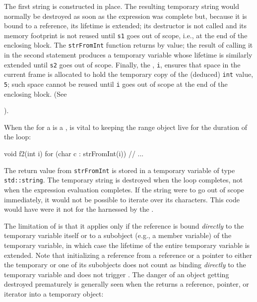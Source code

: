 {{\noindent The first string is constructed in place. The resulting temporary string
would normally be destroyed as soon as the expression was complete but,
because it is bound to a reference, its lifetime is extended; its
destructor is not called and its memory footprint is not reused until
\lstinline!s1! goes out of scope, i.e., at the end of the enclosing block.
The \lstinline!strFromInt! function returns by value; the result of calling
it in the second statement produces a temporary variable whose lifetime
is similarly extended until \lstinline!s2! goes out of scope. Finally, the
, \lstinline!i!, ensures that space in the
current frame is allocated to hold the temporary copy of the (deduced)
\lstinline!int! value, \lstinline!5!; such space cannot be reused until
\lstinline!i! goes out of scope at the end of the enclosing block. (See
{).

When the  for a  is a ,  is
vital to keeping the range object live for the duration of the loop:

\begin{emcppslisting}[emcppsbatch=e3]
void f2(int i)
{
    for (char c : strFromInt(i))
    {
        // ...
    }
}
\end{emcppslisting}
    

\noindent The return value from \lstinline!strFromInt! is stored in a temporary
variable of type \lstinline!std::string!. The temporary string is destroyed
when the loop completes, not when the expression evaluation completes.
If the string were to go out of scope immediately, it would not be
possible to iterate over its characters. This code would have
 were it not for the  harnessed by the .

The limitation of  is that it applies only if
the reference is bound \emph{directly} to the temporary variable itself
or to a subobject (e.g., a member variable) of the temporary variable,
in which case the lifetime of the entire temporary variable is extended.
Note that initializing a reference from a reference or a pointer to
either the temporary or one of its subobjects does not count as binding
\emph{directly} to the temporary variable and does not trigger
. The danger of an object getting destroyed
prematurely is generally seen when the  returns
a reference, pointer, or iterator into a temporary object:

}}}
